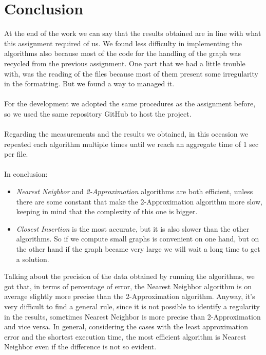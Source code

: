 \section{Conclusion}

At the end of the work we can say that the results obtained are in line with what this assignment required of us.
We found less difficulty in implementing the algorithms also because most of the code for the handling of the graph was recycled from the previous assignment.
One part that we had a little trouble with, was the reading of the files because most of them present some irregularity in the formatting. But we found a way to managed it.\\ \\ \noindent
For the development we adopted the same procedures as the assignment before, so we used the same repository GitHub to host the project.\\ \\ \noindent
Regarding the measurements and the results we obtained, in this occasion we repeated each algorithm multiple times until we reach an  aggregate time of 1 sec per file.\\ \\ \noindent
In conclusion:
\begin{itemize}
    \item \textit{Nearest Neighbor} and \textit{2-Approximation} algorithms are both efficient, unless there are some constant that make the 2-Approximation algorithm more slow, keeping in mind that the complexity of this one is bigger.
    \item \textit{Closest Insertion} is the most accurate, but it is also slower than the other algorithms. So if we compute small graphs is convenient on one hand, but on the other hand if the graph became very large we will wait a long time to get a solution.
\end{itemize}
\noindent
Talking about the precision of the data obtained by running the algorithms, we got that, in terms of percentage of error, the Nearest Neighbor algorithm is on average slightly more precise than the 2-Approximation algorithm. Anyway, it's very difficult to find a general rule, since it is not possible to identify a regularity in the results, sometimes Nearest Neighbor is more precise than 2-Approximation and vice versa.
In general, considering the cases with the least approximation error and the shortest execution time, the most efficient algorithm is Nearest Neighbor even if the difference is not so evident.